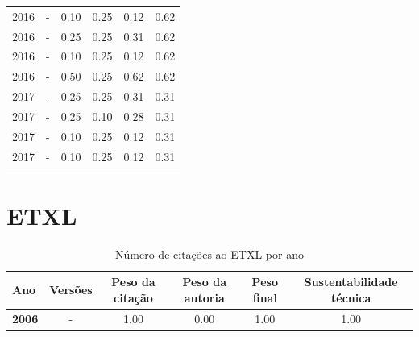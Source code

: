 \begin{table}[H]
\begin{tabular}{| l | c | c | c | c | c |}
            2016
          &
          -
          &
          0.10
          &
          0.25
          &
          0.12
          &
            {\color{blue} 0.62}
          \\
            2016
          &
          -
          &
          0.25
          &
          0.25
          &
          0.31
          &
            {\color{blue} 0.62}
          \\
            2016
          &
          -
          &
          0.10
          &
          0.25
          &
          0.12
          &
            {\color{blue} 0.62}
          \\
            2016
          &
          -
          &
          0.50
          &
          0.25
          &
          0.62
          &
            {\color{blue} 0.62}
          \\
\hline
            2017
          &
          -
          &
          0.25
          &
          0.25
          &
          0.31
          &
            {\color{red} 0.31}
          \\
            2017
          &
          -
          &
          0.25
          &
          0.10
          &
          0.28
          &
            {\color{red} 0.31}
          \\
            2017
          &
          -
          &
          0.10
          &
          0.25
          &
          0.12
          &
            {\color{red} 0.31}
          \\
            2017
          &
          -
          &
          0.10
          &
          0.25
          &
          0.12
          &
            {\color{red} 0.31}
          \\
\hline
\end{tabular}
\end{table}



\section{ETXL}


\begin{table}[H]
\caption{Número de citações ao ETXL por ano}
\centering
\begin{tabular}{| l | c | c | c | c | c |}
  \hline
  Ano & Versões & Peso da citação & Peso da autoria & Peso final & Sustentabilidade técnica \\
  \hline
            {\bf 2006}
          &
          -
          &
          1.00
          &
          0.00
          &
          1.00
          &
            {\color{blue} 1.00}
          \\
\hline
\end{tabular}
\end{table}



